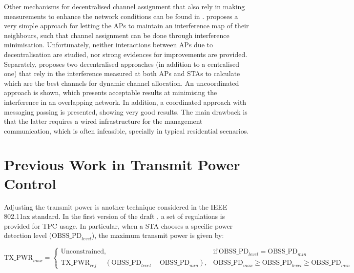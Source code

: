 \documentclass[12pt, a4paper,twoside]{tesi_upf}
\begin{document}
			Other mechanisms for decentralised channel assignment that also rely in making measurements to enhance the network conditions can be found in \cite{akl2007dynamic, chen2007improved}. \cite{akl2007dynamic} proposes a very simple approach for letting the APs to maintain an interference map of their neighbours, such that channel assignment can be done through interference minimisation. Unfortunately, neither interactions between APs due to decentralisation are studied, nor strong evidences for improvements are provided. Separately, \cite{chen2007improved} proposes two decentralised approaches (in addition to a centralised one) that rely in the interference measured at both APs and STAs to calculate which are the best channels for dynamic channel allocation. An uncoordinated approach is shown, which presents acceptable results at minimising the interference in an overlapping network. In addition, a coordinated approach with messaging passing is presented, showing very good results. The main drawback is that the latter requires a wired infrastructure for the management communication, which is often infeasible, specially in typical residential scenarios. 				
			
			\section{Previous Work in Transmit Power Control}
			\label{section:tpc}
				Adjusting the transmit power is another technique considered in the IEEE 802.11ax standard. In the first version of the draft \cite{tgax2016draft}, a set of regulations is provided for TPC usage. In particular, when a STA chooses a specific power detection level ($\text{OBSS\_PD}_{level}$), the maximum transmit power is given by:						
				\begin{scriptsize}
					\begin{equation}
					\text{TX\_PWR}_{max}=
					\begin{cases}
					\text{Unconstrained}, & \text{if}\ \text{OBSS\_PD}_{level} = \text{OBSS\_PD}_{min} \\
					\text{TX\_PWR}_{ref}-(\text{OBSS\_PD}_{level}-\text{OBSS\_PD}_{min}), & \text{OBSS\_PD}_{max} \geq \text{OBSS\_PD}_{level} \geq \text{OBSS\_PD}_{min}
					\end{cases}
					\nonumber
					\end{equation}				
				\end{scriptsize}
				
\end{document}
